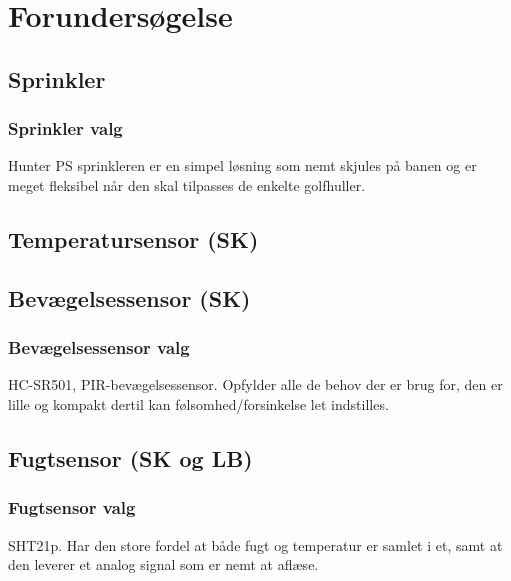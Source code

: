 \chapter{Forundersøgelse}

\section{Sprinkler}								%

\subsection{Sprinkler valg}						%
Hunter PS sprinkleren er en simpel løsning som nemt skjules på banen og er meget fleksibel når den skal tilpasses de enkelte golfhuller.
\clearpage
\section{Temperatursensor (SK)}						



\section{Bevægelsessensor (SK)}						

\subsection{Bevægelsessensor valg}				%
HC-SR501, PIR-bevægelsessensor. Opfylder alle de behov der er brug for, den er lille og kompakt dertil kan følsomhed/forsinkelse let indstilles.

\section{Fugtsensor (SK og LB)}						

\subsection{Fugtsensor valg}						%
SHT21p. Har den store fordel at både fugt og temperatur er samlet i et, samt at den leverer et analog signal som er nemt at aflæse. 